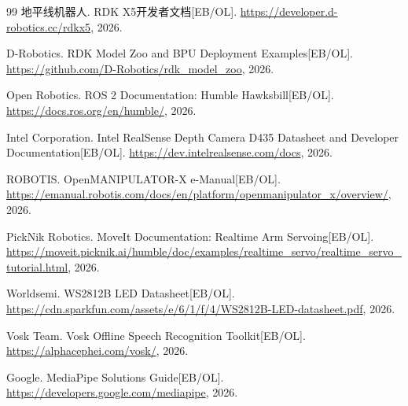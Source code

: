 \documentclass[UTF8,a4paper,zihao=-4]{ctexart}
\begin{document}
\begin{thebibliography}{99}
  地平线机器人. RDK X5开发者文档[EB/OL]. \url{https://developer.d-robotics.cc/rdkx5}, 2026.

  D-Robotics. RDK Model Zoo and BPU Deployment Examples[EB/OL]. \url{https://github.com/D-Robotics/rdk_model_zoo}, 2026.

  Open Robotics. ROS 2 Documentation: Humble Hawksbill[EB/OL]. \url{https://docs.ros.org/en/humble/}, 2026.

  Intel Corporation. Intel RealSense Depth Camera D435 Datasheet and Developer Documentation[EB/OL]. \url{https://dev.intelrealsense.com/docs}, 2026.

  ROBOTIS. OpenMANIPULATOR-X e-Manual[EB/OL]. \url{https://emanual.robotis.com/docs/en/platform/openmanipulator_x/overview/}, 2026.

  PickNik Robotics. MoveIt Documentation: Realtime Arm Servoing[EB/OL]. \url{https://moveit.picknik.ai/humble/doc/examples/realtime_servo/realtime_servo_tutorial.html}, 2026.

  Worldsemi. WS2812B LED Datasheet[EB/OL]. \url{https://cdn.sparkfun.com/assets/e/6/1/f/4/WS2812B-LED-datasheet.pdf}, 2026.

  Vosk Team. Vosk Offline Speech Recognition Toolkit[EB/OL]. \url{https://alphacephei.com/vosk/}, 2026.

  Google. MediaPipe Solutions Guide[EB/OL]. \url{https://developers.google.com/mediapipe}, 2026.
\end{thebibliography}
\end{document}
